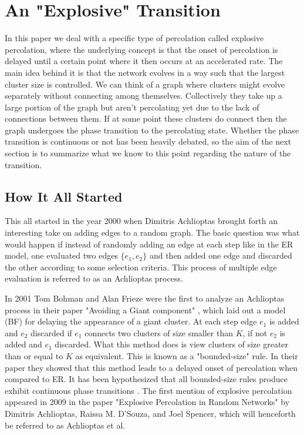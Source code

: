 \section{An "Explosive" Transition}
In this paper we deal with a specific type of percolation called explosive percolation, where the underlying concept is that the onset of percolation is delayed until a certain point where it then occurs at an accelerated rate.
The main idea behind it is that the network evolves in a way such that the largest cluster size is controlled.
We can think of a graph where clusters might evolve separately without connecting among themselves.
Collectively they take up a large portion of the graph but aren't percolating yet due to the lack of connections between them.
If at some point these clusters do connect then the graph undergoes the phase transition to the percolating state.
Whether the phase transition is continuous or not has been heavily debated, so the aim of the next section is to summarize what we know to this point regarding the nature of the transition.

\subsection{How It All Started}
This all started in the year 2000 when Dimitris Achlioptas brought forth an interesting take on adding edges to a random graph.
The basic question was what would happen if instead of randomly adding an edge at each step like in the ER model, one evaluated two edges $\{e_1, e_2\}$ and then added one edge and discarded the other according to some selection criteria.
This process of multiple edge evaluation is referred to as an Achlioptas process.

In 2001 Tom Bohman and Alan Frieze were the first to analyze an Achlioptas process in their paper "Avoiding a Giant component" \cite{BF}, which laid out a model (BF) for delaying the appearance of a giant cluster.
At each step edge $e_1$ is added and $e_2$ discarded if $e_1$ connects two clusters of size smaller than $K$, if not $e_2$ is added and $e_1$ discarded.
What this method does is view clusters of size greater than or equal to $K$ as equivalent.
This is known as a "bounded-size" rule.
In their paper they showed that this method leads to a delayed onset of percolation when compared to ER.
It has been hypothesized that all bounded-size rules produce exhibit continuous phase transitions \cite{20070000}.
The first mention of explosive percolation appeared in 2009 in the paper "Explosive Percolation in Random Networks" \cite{20090313} by Dimitris Achlioptas, Raissa M. D’Souza, and Joel Spencer, which will henceforth be referred to as Achlioptas et al.
